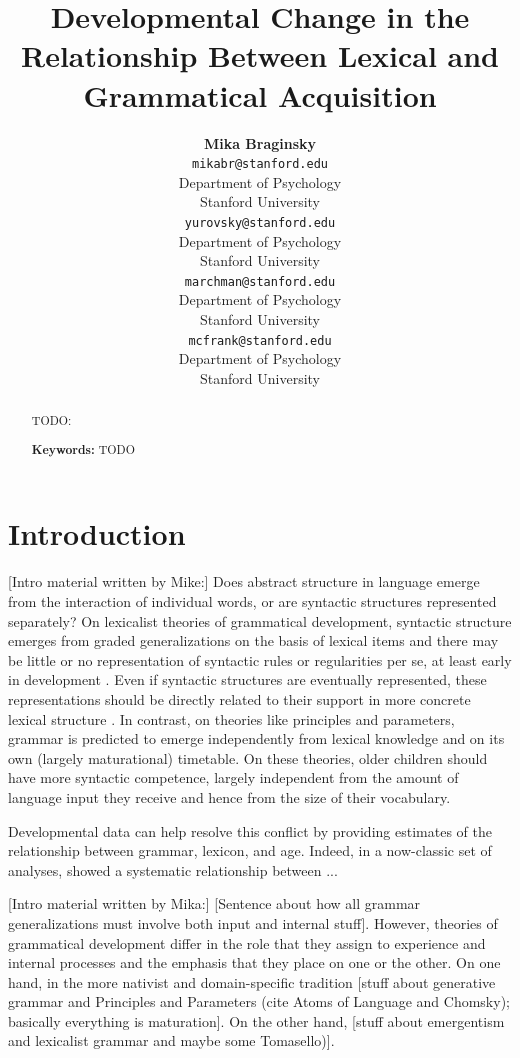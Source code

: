 \documentclass[10pt,letterpaper]{article}
\title{Developmental Change in the Relationship Between Lexical and Grammatical Acquisition}
\author{{\large \bf Mika Braginsky} \\
  \texttt{mikabr@stanford.edu} \\
  Department of Psychology \\
  Stanford University
  \And {\large \bf Daniel Yurovsky} \\
  \texttt{yurovsky@stanford.edu} \\
  Department of Psychology \\
  Stanford University
    \And {\large \bf Virginia Marchman} \\
    \texttt{marchman@stanford.edu} \\
  Department of Psychology \\
  Stanford University
    \And {\large \bf Michael C. Frank}\\
    \texttt{mcfrank@stanford.edu} \\
  Department of Psychology \\
  Stanford University}
\begin{document}
\maketitle

\begin{abstract}
TODO: \lipsum[1]

\textbf{Keywords:} 
TODO
\end{abstract}

\section{Introduction}

[Intro material written by Mike:]
Does abstract structure in language emerge from the interaction of individual words, or are syntactic structures represented separately? On lexicalist theories of grammatical development, syntactic structure emerges from graded generalizations on the basis of lexical items and there may be little or no representation of syntactic rules or regularities per se, at least early in development \cite{tomasello2001,tomasello2003}. Even if syntactic structures are eventually represented, these representations should be directly related to their support in more concrete lexical structure \cite{bannard2009,bod2010}. In contrast, on theories like principles and parameters, grammar is predicted to emerge independently from lexical knowledge and on its own (largely maturational) timetable. On these theories, older children should have more syntactic competence, largely independent from the amount of language input they receive and hence from the size of their vocabulary.

Developmental data can help resolve this conflict by providing estimates of the relationship between grammar, lexicon, and age. Indeed, in a now-classic set of analyses, \cite{bates1994} showed a systematic relationship between ...

[Intro material written by Mika:]
[Sentence about how all grammar generalizations must involve both input and internal stuff]. However, theories of grammatical development differ in the role that they assign to experience and internal processes and the emphasis that they place on one or the other. On one hand, in the more nativist and domain-specific tradition [stuff about generative grammar and Principles and Parameters (cite Atoms of Language and Chomsky); basically everything is maturation]. On the other hand, [stuff about emergentism and lexicalist grammar \cite{bates1999} and maybe some Tomasello)].
\end{document}
